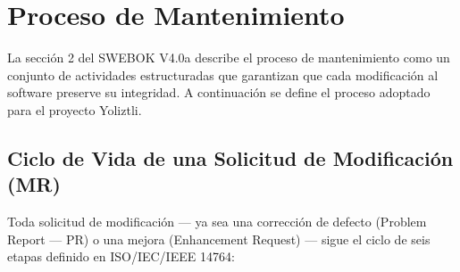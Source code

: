 
\chapter{Proceso de Mantenimiento}

La sección 2 del SWEBOK V4.0a describe el proceso de mantenimiento como un conjunto
de actividades estructuradas que garantizan que cada modificación al software preserve
su integridad. A continuación se define el proceso adoptado para el proyecto Yoliztli.

\section{Ciclo de Vida de una Solicitud de Modificación (MR)}

Toda solicitud de modificación --- ya sea una corrección de defecto (Problem Report --- PR)
o una mejora (Enhancement Request) --- sigue el ciclo de seis etapas definido en
ISO/IEC/IEEE 14764:

